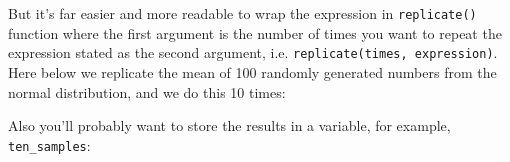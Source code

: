 \documentclass[]{book}
\newenvironment{Shaded}{\begin{snugshade}}{\end{snugshade}}
\newcommand{\CommentTok}[1]{\textcolor[rgb]{0.56,0.35,0.01}{\textit{#1}}}
\newcommand{\DecValTok}[1]{\textcolor[rgb]{0.00,0.00,0.81}{#1}}
\newcommand{\KeywordTok}[1]{\textcolor[rgb]{0.13,0.29,0.53}{\textbf{#1}}}
\newcommand{\NormalTok}[1]{#1}
\newcommand{\OperatorTok}[1]{\textcolor[rgb]{0.81,0.36,0.00}{\textbf{#1}}}
\newcommand{\StringTok}[1]{\textcolor[rgb]{0.31,0.60,0.02}{#1}}
\begin{document}
\begin{Shaded}
\end{Shaded}

But it's far easier and more readable to wrap the expression in \texttt{replicate()} function where the first argument is the number of times you want to repeat the expression stated as the second argument, i.e. \texttt{replicate(times,\ expression)}. Here below we replicate the mean of 100 randomly generated numbers from the normal distribution, and we do this 10 times:

\begin{Shaded}
\end{Shaded}

Also you'll probably want to store the results in a variable, for example, \texttt{ten\_samples}:

\begin{Shaded}
\end{Shaded}
\end{document}
